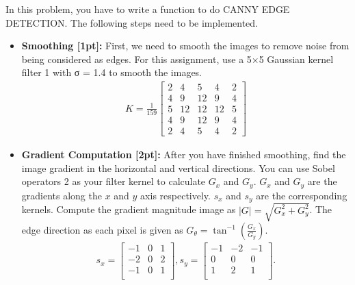 \documentclass{assignment}
\begin{document}
\begin{problemlist}
In this problem, you have to write a function to do CANNY EDGE DETECTION. The following steps need to be implemented.
\begin{itemize}
    \item\textbf{Smoothing [1pt]:} First, we need to smooth the images to remove noise from being considered as edges. For this assignment, use a 5$\times$5 Gaussian kernel filter 1 with σ = 1.4 to smooth the images.\\
    \begin{align}
        K = \frac{1}{159}
        \begin{bmatrix}
        2&4&5&4&2\\
        4&9&12&9&4\\
        5&12&12&12&5\\
        4&9&12&9&4\\
        2&4&5&4&2
        \end{bmatrix}
    \end{align}
    
    \item\textbf{Gradient Computation [2pt]:}
    After you have finished smoothing, find the image gradient in the horizontal and vertical directions. You can use Sobel operators 2 as your filter kernel to calculate $G_x$ and $G_y$. $G_x$ and $G_y$ are the gradients along the $x$ and $y$ axis respectively. $s_x$ and $s_y$ are the corresponding kernels. Compute the gradient magnitude image as $|G| = \sqrt{G^{2}_x + G^{2}_y}$. The edge direction as each pixel is given as $G_{\theta} = \tan^{-1}(\frac{G_x}{G_y}).$
    \begin{align}
        s_x =
        \begin{bmatrix}
        -1&0&1\\
        -2&0&2\\
        -1&0&1\\
        \end{bmatrix},
        s_y =
        \begin{bmatrix}
        -1&-2&-1\\
        0&0&0\\
        1&2&1\\
        \end{bmatrix}.
    \end{align}
    

\end{itemize}
\end{problemlist}
\end{document}
